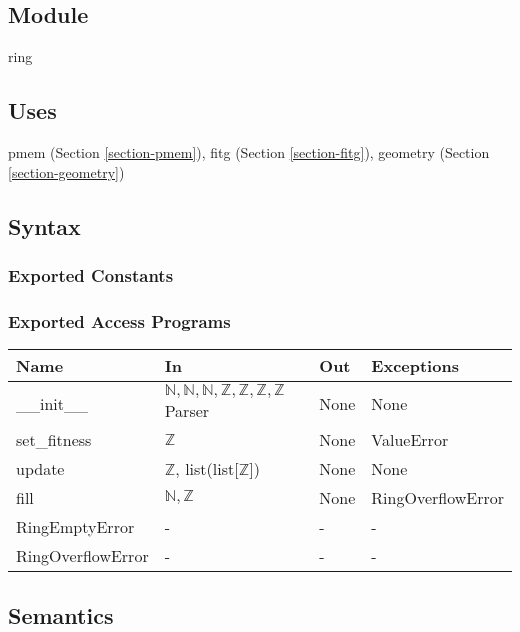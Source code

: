 \documentclass[12pt, titlepage]{article}
\begin{document}
\subsection{Module}

ring

\subsection{Uses}

pmem (Section \ref{section-pmem}),
fitg (Section \ref{section-fitg}),
geometry (Section \ref{section-geometry})

\subsection{Syntax}

\subsubsection{Exported Constants}

\subsubsection{Exported Access Programs}

\begin{center}
	\begin{tabular}{p{4cm} p{4cm} p{2cm} p{2cm}}
		\hline
		\textbf{Name} & \textbf{In} & \textbf{Out} & \textbf{Exceptions} \\
		\hline
		\_\_init\_\_ & $\mathbb{N}, \mathbb{N}, \mathbb{N}, \mathbb{Z}, 
		\mathbb{Z}, \mathbb{Z}, \mathbb{Z}$ Parser & None & None \\
		set\_fitness & $\mathbb{Z}$ & None & ValueError \\
		update & $\mathbb{Z}$, list(list[$\mathbb{Z}$]) & None & None \\
		fill & $\mathbb{N}, \mathbb{Z}$ & None & RingOverflowError \\
		RingEmptyError  & - & - & - \\
		RingOverflowError & - & - & - \\
		\hline
	\end{tabular}
\end{center}

\subsection{Semantics}
\end{document}
